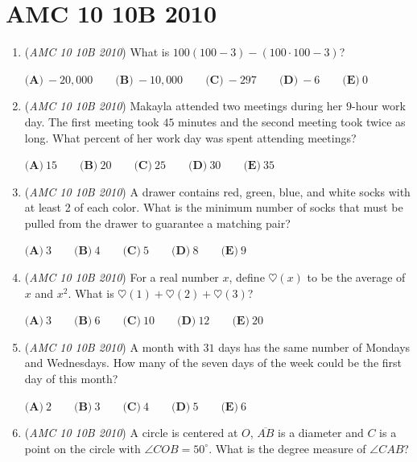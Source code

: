 \section{AMC 10 10B 2010}
        \begin{enumerate}
        	\item (\textit{AMC 10 10B 2010}) What is $100(100-3)-(100\cdot100-3)$?


 $\textbf{(A)}\ -20,000 \qquad \textbf{(B)}\ -10,000 \qquad \textbf{(C)}\ -297 \qquad \textbf{(D)}\ -6 \qquad \textbf{(E)}\ 0$


	\item (\textit{AMC 10 10B 2010}) Makayla attended two meetings during her $9$-hour work day. The first meeting took $45$ minutes and the second meeting took twice as long. What percent of her work day was spent attending meetings?


 $\textbf{(A)}\ 15 \qquad \textbf{(B)}\ 20 \qquad \textbf{(C)}\ 25 \qquad \textbf{(D)}\ 30 \qquad \textbf{(E)}\ 35$


	\item (\textit{AMC 10 10B 2010}) A drawer contains red, green, blue, and white socks with at least 2 of each color. What is
the minimum number of socks that must be pulled from the drawer to guarantee a matching
pair?


 $\textbf{(A)}\ 3 \qquad \textbf{(B)}\ 4 \qquad \textbf{(C)}\ 5 \qquad \textbf{(D)}\ 8 \qquad \textbf{(E)}\ 9$


	\item (\textit{AMC 10 10B 2010}) For a real number $x$, define $\heartsuit(x)$ to be the average of $x$ and $x^2$. What is $\heartsuit(1)+\heartsuit(2)+\heartsuit(3)$?


 $\textbf{(A)}\ 3 \qquad \textbf{(B)}\ 6 \qquad \textbf{(C)}\ 10 \qquad \textbf{(D)}\ 12 \qquad \textbf{(E)}\ 20$


	\item (\textit{AMC 10 10B 2010}) A month with $31$ days has the same number of Mondays and Wednesdays. How many of the seven days of the week could be the first day of this month?


 $\textbf{(A)}\ 2 \qquad \textbf{(B)}\ 3 \qquad \textbf{(C)}\ 4 \qquad \textbf{(D)}\ 5 \qquad \textbf{(E)}\ 6$


	\item (\textit{AMC 10 10B 2010}) A circle is centered at $O$, $\overline{AB}$ is a diameter and $C$ is a point on the circle with $\angle COB = 50^\circ$.
What is the degree measure of $\angle CAB$?



\end{enumerate}
